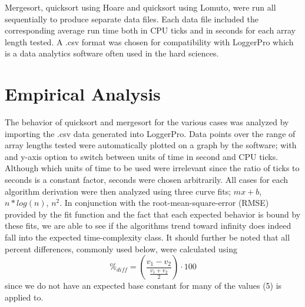 \documentclass[11pt,letterpaper]{report}
\begin{document}
Mergesort, quicksort using Hoare and quicksort using Lomuto, were run all sequentially to produce separate data files. Each data file included the corresponding average run time both in CPU ticks and in seconds for each array length tested. A .csv format was chosen for compatibility with LoggerPro which is a data analytics software often used in the hard sciences.

\section*{Empirical Analysis}
The behavior of quicksort and mergesort for the various cases was analyzed by importing the .csv data generated into LoggerPro. Data points over the range of array lengths tested were automatically plotted on a graph by the software; with and y-axis option to switch between units of time in second and CPU ticks. Although which units of time to be used were irrelevant since the ratio of ticks to seconds is a constant factor, seconds were chosen arbitrarily.
All cases for each algorithm derivation were then analyzed using three curve fits; $mx+b$, $n*log{}(n)$, $n^2$. In conjunction with the root-mean-square-error (RMSE) provided by the fit function and the fact that each expected behavior is bound by these fits, we are able to see if the algorithms trend toward infinity does indeed fall into the expected time-complexity class. It should further be noted that all percent differences, commonly used below, were calculated using
\begin{equation} 
\%_{diff}  = (\frac{v_1-v_2}{\frac{v_1+v_2}{2}})  \cdot 100
\end{equation}
since we do not have an expected base constant for many of the values (5) is applied to. 
\end{document}
